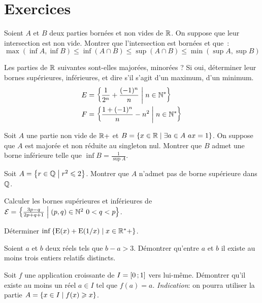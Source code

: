 \section{Exercices}
\begin{exercice}
  Soient \(A\) et \(B\) deux parties bornées et non vides de \(\mathbb{R}\). On suppose 
  que leur intersection est non vide. Montrer que l'intersection est bornées et 
  que~:
  \[ \max(\inf A, \inf B) \leqslant \inf(A \cap B) \leqslant \sup(A \cap B) 
  \leqslant \min(\sup A, \sup B)\]
\end{exercice}
\begin{exercice}
  Les parties de \(\mathbb{R}\) suivantes sont-elles majorées, minorées ? Si oui, 
  déterminer leur bornes supérieures, inférieures, et dire s'il s'agit d'un 
  maximum, d'un minimum.
  \begin{align*}
    E &= \left\{\frac{1}{2^n}+\frac{(-1)^n}{n}\mathrel{}\middle|\mathrel{}n \in \mathbb{N}^*\right\} \\
    F &= \left\{\frac{1+(-1)^n}{n}-n^2\mathrel{}\middle|\mathrel{}n \in \mathbb{N}^*\right\}
  \end{align*}
\end{exercice}
\begin{exercice}
  Soit \(A\) une partie non vide de \(\mathbb{R}+\) et \(B = \left\{x \in \mathbb{R}\mathrel{}\middle|\mathrel{}\exists a 
  \in A \ ax=1\right\}\). On suppose que \(A\) est majorée et non réduite au singleton 
  nul. Montrer que \(B\) admet une borne inférieure telle que \(\inf B = 
  \frac{1}{\sup A}\).
\end{exercice}
\begin{exercice}
  Soit \(A = \left\{r \in \mathbb{Q}\mathrel{}\middle|\mathrel{}r^2 \leqslant 2\right\}\). Montrer que \(A\) n'admet pas 
  de borne supérieure dans \(\mathbb{Q}\).
\end{exercice}
\begin{exercice}
  Calculer les bornes supérieures et inférieures de \(\mathcal{E} = 
  \left\{\frac{3p-q}{2p+q+1}\mathrel{}\middle|\mathrel{}(p,q) \in \mathbb{N}^2 \ 0 <q<p\right\}\).
\end{exercice}
\begin{exercice}
  Déterminer \(\inf \left\{\operatorname{E}(x) + \operatorname{E}(1/x)\mathrel{}\middle|\mathrel{}x \in \mathbb{R}^*+\right\}\).
\end{exercice}
\begin{exercice}
  Soient \(a\) et \(b\) deux réels tels que \(b-a>3\). Démontrer qu'entre \(a\) 
  et \(b\) il existe au moins trois entiers relatifs distincts.
\end{exercice}
\begin{exercice}
  Soit \(f\) une application croissante de \(I = \left[ 0 \, ;  1 \right]\) vers 
  lui-même. Démontrer qu'il existe au moins un réel \(a \in I\) tel que 
  \(f(a)=a\).
  \emph{Indication}: on pourra utiliser la partie \(A = \left\{x \in I\mathrel{}\middle|\mathrel{}f(x) 
  \geqslant x\right\}\).
\end{exercice}
